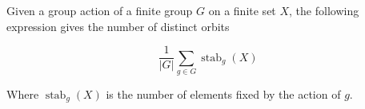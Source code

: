 \documentclass{article}
\begin{document}
Given a group action of a finite group $G$ on a finite set $X$, the following expression gives the number of distinct orbits

$$ \frac{1}{|G|}\sum_{g\in G}\operatorname{stab}_g(X) $$

Where $\operatorname{stab}_g(X)$ is the number of elements fixed by the action of $g$.
\end{document}
